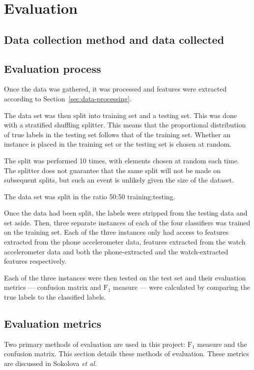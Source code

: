 \chapter{Evaluation}
  \section{Data collection method and data collected}
  
  \section{Evaluation process}
    Once the data was gathered, it was processed and features were extracted according to Section~\ref{sec:data-processing}.
    
    The data set was then split into training set and a testing set. This was done with a stratified shuffling splitter. This means that the proportional distribution of true labels in the testing set follows that of the training set. Whether an instance is placed in the training set or the testing set is chosen at random.
    
    The split was performed 10 times, with elements chosen at random each time. The splitter does not guarantee that the same split will not be made on subsequent splits, but such an event is unlikely given the size of the dataset.
    
    The data set was split in the ratio 50:50 training:testing.
    
    Once the data had been split, the labels were stripped from the testing data and set aside. Then, three separate instances of each of the four classifiers was trained on the training set. Each of the three instances only had access to features extracted from the phone accelerometer data, features extracted from the watch accelerometer data and both the phone-extracted and the watch-extracted features respectively.
    
    Each of the three instances were then tested on the test set and their evaluation metrics --- confusion matrix and $\mathrm{F}_1$ measure --- were calculated by comparing the true labels to the classified labels.
  \section{Evaluation metrics}
    Two primary methods of evaluation are used in this project: $\mathrm{F}_1$ measure and the confusion matrix.
    This section details these methods of evaluation. These metrics are discussed in Sokolova \emph{et al.}\cite{sokolova2009systematic}
